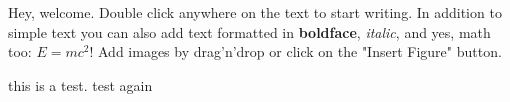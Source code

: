 Hey, welcome. Double click anywhere on the text to start writing. In addition to simple text you can also add text formatted in \textbf{boldface}, \textit{italic}, and yes, math too: $E  =  mc^{2}$! Add images by drag'n'drop or click on the "Insert Figure" button.

this is a test. \cite{Birge_1985}
  test again \cite{Takriti_1996}
  